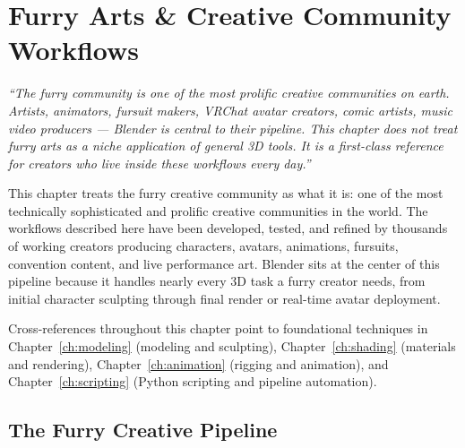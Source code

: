 
\chapter{Furry Arts \& Creative Community Workflows}
\label{ch:furryarts}

\begin{quotebox}
\itshape ``The furry community is one of the most prolific creative communities on earth. Artists, animators, fursuit makers, VRChat avatar creators, comic artists, music video producers --- Blender is central to their pipeline. This chapter does not treat furry arts as a niche application of general 3D tools. It is a first-class reference for creators who live inside these workflows every day.''
\end{quotebox}

\vspace{1em}

This chapter treats the furry creative community as what it is: one of the most technically sophisticated and prolific creative communities in the world. The workflows described here have been developed, tested, and refined by thousands of working creators producing characters, avatars, animations, fursuits, convention content, and live performance art. Blender sits at the center of this pipeline because it handles nearly every 3D task a furry creator needs, from initial character sculpting through final render or real-time avatar deployment.

Cross-references throughout this chapter point to foundational techniques in Chapter~\ref{ch:modeling} (modeling and sculpting), Chapter~\ref{ch:shading} (materials and rendering), Chapter~\ref{ch:animation} (rigging and animation), and Chapter~\ref{ch:scripting} (Python scripting and pipeline automation).



\section{The Furry Creative Pipeline}
\label{sec:furry-pipeline}

